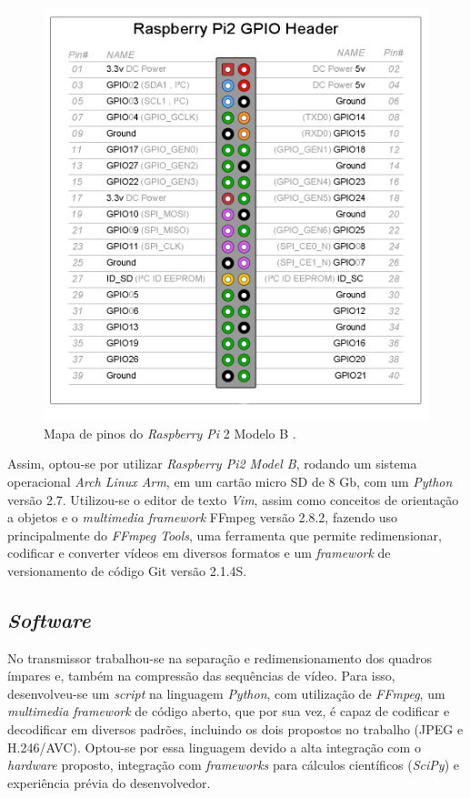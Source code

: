 \begin{figure}[h]
	\centering
	\includegraphics[scale=.3]{figuras/GPIO_Pi2.png}
	\caption{ Mapa de pinos do \textit{Raspberry Pi} 2 Modelo B \cite{element14}.}
	\label{fig:rasp_gpio}
\end{figure}

Assim, optou-se por utilizar \textit{Raspberry Pi2 Model B}, rodando um sistema operacional \textit{Arch Linux Arm}, em um cartão micro SD de 8 Gb,  com um \textit{Python} versão 2.7.
Utilizou-se o editor de texto \textit{Vim}, assim como conceitos de orientação a objetos e o \textit{multimedia framework} FFmpeg versão 2.8.2, fazendo uso principalmente do \textit{FFmpeg Tools}, uma ferramenta que permite redimensionar, codificar e converter vídeos em diversos formatos e um \textit{framework} de versionamento de código Git versão 2.1.4S.
\subsection{\textit{Software}}

No transmissor trabalhou-se na separação e redimensionamento dos quadros ímpares e, também na compressão das sequências de vídeo. Para isso, desenvolveu-se um \textit{script} na linguagem \textit{Python}, com utilização de \textit{FFmpeg}, um \textit{multimedia framework} de código aberto, que por sua vez, é  capaz de codificar e decodificar em diversos padrões, incluindo os dois propostos no trabalho (JPEG e H.246/AVC). Optou-se por essa linguagem devido a alta integração com o \textit{hardware} proposto, integração com \textit{frameworks} para cálculos científicos (\textit{SciPy}) e experiência prévia do desenvolvedor. 

